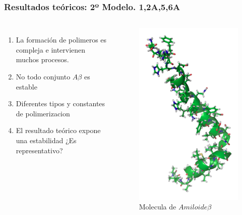 \documentclass{beamer}
\begin{document}
\begin{frame}
	\frametitle{Resultados teóricos: 2º Modelo. 1,2A,5,6A}
	\begin{columns}[t]
		\begin{enumerate}
			\item La formación de polimeros es compleja e intervienen muchos procesos.
			\item No todo conjunto $A\beta$ es estable
			\item Diferentes tipos y constantes de polimerizacion
			\item El resultado teórico expone una estabilidad ¿Es representativo?
		\end{enumerate}
		
		\begin{figure}[Atrofia cerebral]
			\includegraphics[scale=0.15]{beta.png}
			\caption{Molecula de $Amiloide\beta$}
			\label{cerebro4}
		\end{figure}
	\end{columns}
	
\end{frame}
\end{document}
